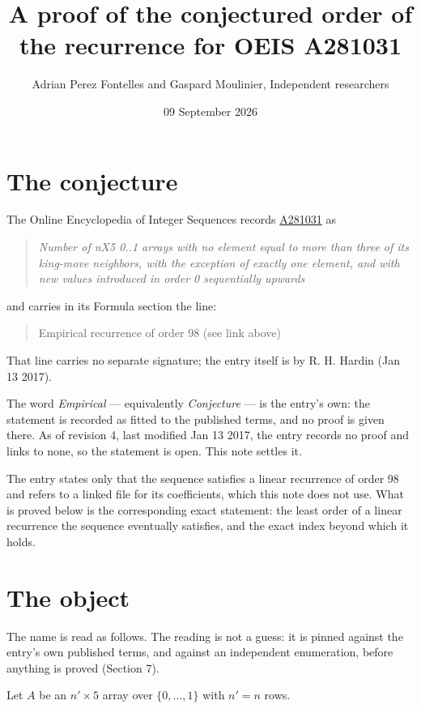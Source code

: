 \documentclass[11pt]{article}
\title{A proof of the conjectured order of the recurrence for OEIS A281031}
\author{Adrian Perez Fontelles and Gaspard Moulinier, Independent researchers}
\date{09 September 2026}
\theoremstyle{definition}
\begin{document}
\maketitle
\section{The conjecture}

The Online Encyclopedia of Integer Sequences records \href{https://oeis.org/A281031}{A281031} as

\begin{quote}\itshape Number of nX5 0..1 arrays with no element equal to more than three of its king-move neighbors, with the exception of exactly one element, and with new values introduced in order 0 sequentially upwards\end{quote}

and carries in its Formula section the line:

\begin{quote}\ttfamily Empirical recurrence of order 98 (see link above)\end{quote}

That line carries no separate signature; the entry itself is by R. H. Hardin (Jan 13 2017).

The word {\itshape Empirical} --- equivalently {\itshape Conjecture} --- is the entry's own: the statement is recorded as fitted to the published terms, and no proof is given there. As of revision 4, last modified Jan 13 2017, the entry records no proof and links to none, so the statement is open. This note settles it.

The entry states only that the sequence satisfies a linear recurrence of order $98$ and refers to a linked file for its coefficients, which this note does not use. What is proved below is the corresponding exact statement: the least order of a linear recurrence the sequence eventually satisfies, and the exact index beyond which it holds.

\section{The object}

The name is read as follows. The reading is not a guess: it is pinned against the entry's own published terms, and against an independent enumeration, before anything is proved (Section 7).

Let $A$ be an $n' \times 5$ array over $\{0,\dots,1\}$ with $n' = n$ rows.
\end{document}
